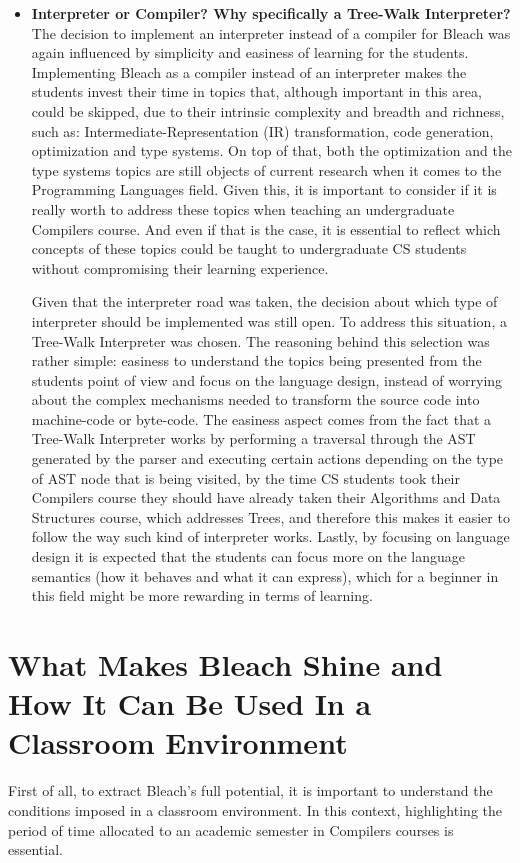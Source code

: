 \begin{itemize}
\begin{itemize}
        \item \textbf{Interpreter or Compiler? Why specifically a Tree-Walk Interpreter?} The decision to implement an interpreter instead of a compiler for Bleach was again influenced by simplicity and easiness of learning for the students. Implementing Bleach as a compiler instead of an interpreter makes the students invest their time in topics that, although important in this area, could be skipped, due to their intrinsic complexity and breadth and richness, such as: Intermediate-Representation (IR) transformation, code generation, optimization and type systems. On top of that, both the optimization and the type systems topics are still objects of current research when it comes to the Programming Languages field. Given this, it is important to consider if it is really worth to address these topics when teaching an undergraduate Compilers course. And even if that is the case, it is essential to reflect which concepts of these topics could be taught to undergraduate CS students without compromising their learning experience.

        Given that the interpreter road was taken, the decision about which type of interpreter should be implemented was still open. To address this situation, a Tree-Walk Interpreter was chosen. The reasoning behind this selection was rather simple: easiness to understand the topics being presented from the students point of view and focus on the language design, instead of worrying about the complex mechanisms needed to transform the source code into machine-code or byte-code. The easiness aspect comes from the fact that a Tree-Walk Interpreter works by performing a traversal through the AST generated by the parser and executing certain actions depending on the type of AST node that is being visited, by the time CS students took their Compilers course they should have already taken their Algorithms and Data Structures course, which addresses Trees, and therefore this makes it easier to follow the way such kind of interpreter works. Lastly, by focusing on language design it is expected that the students can focus more on the language semantics (how it behaves and what it can express), which for a beginner in this field might be more rewarding in terms of learning.

        
    \end{itemize}
\end{itemize}


\section{What Makes Bleach Shine and How It Can Be Used In a Classroom Environment}
First of all, to extract Bleach's full potential, it is important to understand the conditions imposed in a classroom environment. In this context, highlighting the period of time allocated to an academic semester in Compilers courses is essential.

